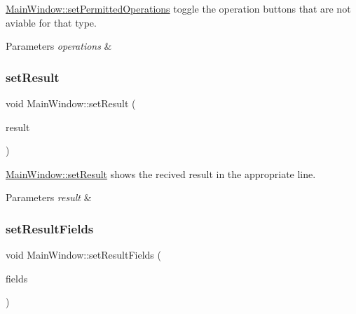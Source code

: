 \hyperlink{class_main_window_a86f711960ec362153b5d2ef6667c6c0c}{Main\+Window\+::set\+Permitted\+Operations} toggle the operation buttons that are not aviable for that type. 


\begin{DoxyParams}{Parameters}
{\em operations} & \\
\hline
\end{DoxyParams}
\mbox{\label{class_main_window_a04fa84f042da5f258d1dc09803667bbf}} 
\subsubsection{\texorpdfstring{set\+Result}{setResult}}
{\footnotesize\ttfamily void Main\+Window\+::set\+Result (\begin{DoxyParamCaption}\item[{const Q\+Vector$<$ Q\+String $>$}]{result }\end{DoxyParamCaption})\hspace{0.3cm}{\ttfamily [slot]}}



\hyperlink{class_main_window_a04fa84f042da5f258d1dc09803667bbf}{Main\+Window\+::set\+Result} shows the recived result in the appropriate line. 


\begin{DoxyParams}{Parameters}
{\em result} & \\
\hline
\end{DoxyParams}
\mbox{\label{class_main_window_ae00d4afec436d34430e43dcc6742b875}} 
\subsubsection{\texorpdfstring{set\+Result\+Fields}{setResultFields}}
{\footnotesize\ttfamily void Main\+Window\+::set\+Result\+Fields (\begin{DoxyParamCaption}\item[{const int \&}]{fields }\end{DoxyParamCaption})\hspace{0.3cm}{\ttfamily [slot]}}



